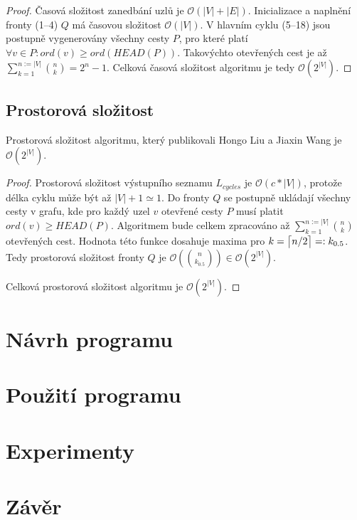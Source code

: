         \begin{proof}
            Časová složitost zanedbání uzlů je $\mathcal{O}(|V| + |E|)$. Inicializace a naplnění fronty (1--4) $Q$ má časovou složitost $\mathcal{O}(|V|)$. V hlavním cyklu (5--18) jsou postupně vygenerovány všechny cesty $P$, pro které platí $\forall v \in P: ord(v) \geq ord(HEAD(P))$. Takovýchto otevřených cest je až $\sum_{k=1}^{n:= |V|} {n \choose k} = 2^n - 1$. Celková časová složitost algoritmu je tedy $\mathcal{O}(2^{|V|})$.
        \end{proof}

    \section{Prostorová složitost}
        \begin{theorem}
            Prostorová složitost algoritmu, který publikovali Hongo Liu a Jiaxin Wang je $\mathcal{O}(2^{|V|})$.
        \end{theorem}

        \begin{proof}
            Prostorová složitost výstupního seznamu $L_{cycles}$ je $\mathcal{O}(c * |V|)$, protože délka cyklu může být až $|V| + 1 \simeq 1$. Do fronty $Q$ se postupně ukládají všechny cesty v grafu, kde pro každý uzel $v$ otevřené cesty $P$ musí platit $ord(v) \geq HEAD(P)$. Algoritmem bude celkem zpracováno až $\sum_{k=1}^{n:= |V|} {n \choose k}$ otevřených cest. Hodnota této funkce dosahuje maxima pro $k = \ceil[\big]{n/2} =: k_{0.5}$. Tedy prostorová složitost fronty $Q$ je $\mathcal{O}({n \choose k_{0.5}}) \in \mathcal{O}(2^{|V|})$.

            Celková prostorová složitost algoritmu je $\mathcal{O}(2^{|V|})$.
        \end{proof}

\chapter{Návrh programu}
    \label{chapter:Design}
    \lipsum

\chapter{Použití programu}
    \label{chapter:Help}
    \lipsum

\chapter{Experimenty}
    \label{chapter:Experiments}
    \lipsum

\chapter{Závěr}
    \label{chapter:Conclusion}
    \lipsum[2]
